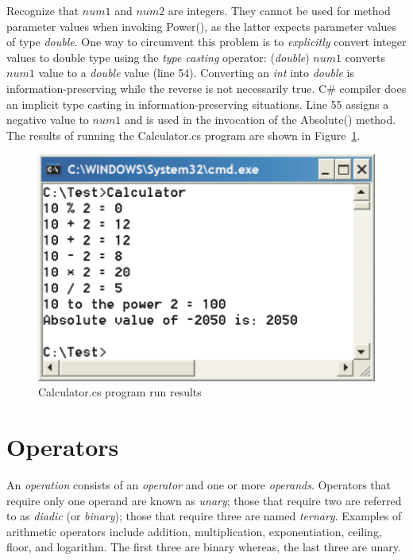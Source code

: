 Recognize that $num1$ and $num2$ are integers. They cannot be used
for method parameter values when invoking Power(), as the latter
expects parameter values of type \emph{double}. One way to
circumvent this problem is to \emph{explicitly} convert integer
values to double type using the \emph{type casting} operator:
(\emph{double}) $num1$ converts $num1$ value to a \emph{double}
value (line 54). Converting an \emph{int} into \emph{double} is
information-preserving while the reverse is not necessarily true.
C\# compiler does an implicit type casting in
information-preserving situations. Line 55 assigns a negative
value to $num1$ and is used in the invocation of the Absolute()
method. The results of running the Calculator.cs program are shown
in Figure~\ref{fig:CalculatorOut}.

\begin{figure}
\centering
\includegraphics[scale=0.45]{./CSharpBasics/Illus/CalculatorOut}
\caption{Calculator.cs program run results}
\label{fig:CalculatorOut}
\end{figure}



{\samepage\vspace{1ex}\noindent\usebox{\phicsep}\vspace{1.5ex}}
\vspace{-0.4in}
\section{Operators} \label{sec:Operators}


An \emph{operation} consists of an \emph{operator} and one or more
\emph{operands}. Operators that require only one operand are known
as \emph{unary}; those that require two are referred to as
\emph{diadic} (or \emph{binary}); those that require three are
named \emph{ternary}. Examples of arithmetic operators include
addition, multiplication, exponentiation, ceiling, floor, and
logarithm. The first three are binary whereas, the last three are
unary.

